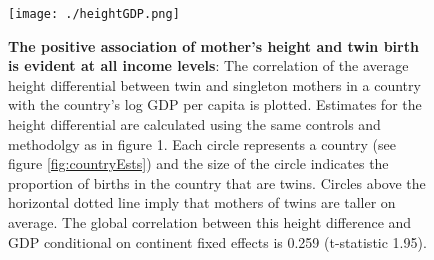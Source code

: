 \documentclass{nature}
\begin{document}
\begin{linenumbers}
\begin{spacing}{1}
\begin{figure}[htpb!]
  \texttt{[image: ./heightGDP.png]}
\vspace{5mm}
\caption{\textbf{The positive association of mother's height and twin birth is evident at all income levels}: {\footnotesize The correlation of the average height differential between twin and singleton mothers in a country with the country's log GDP per capita is plotted.  Estimates for the height differential are calculated using the same controls and methodolgy as in figure 1.
Each circle represents a country (see figure \ref{fig:countryEsts}) and the size of the circle indicates the proportion of births in the country that are twins. Circles above the horizontal dotted line imply that mothers of twins are taller on average. The global correlation between this height difference and GDP conditional on continent fixed effects is 0.259 (t-statistic 1.95).}} %
\label{fig:GDPEsts}
\end{figure}




\end{spacing}
\end{linenumbers}
\end{document}
